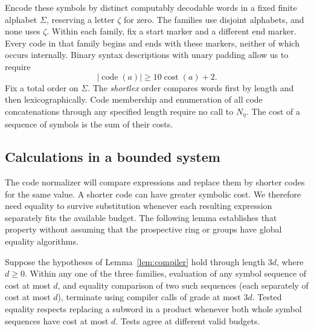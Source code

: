 Encode these symbols by distinct computably decodable words in
a fixed finite alphabet $\Sigma$, reserving a letter $\zeta$ for
zero. The families use disjoint alphabets, and none uses $\zeta$.
Within each family, fix a start marker and a different end marker.
Every code in that family begins and ends with these markers,
neither of which occurs internally.  Binary syntax descriptions with unary
padding allow us to require
\begin{equation}\label{eq:code-cost}
 |\operatorname{code}(a)|\geq10\operatorname{cost}(a)+2.
\end{equation}
Fix a total order on $\Sigma$. The \emph{shortlex} order compares
words first by length and then lexicographically.
Code membership and enumeration of all code concatenations
through any specified length require no call to $N_\eta$.
The cost of a sequence of symbols is the sum of their costs.

\subsection{Calculations in a bounded system}

The code normalizer will compare expressions and replace them by
shorter codes for the same value.  A shorter code can have greater
symbolic cost.  We therefore need equality to survive substitution
whenever each resulting expression separately fits the available
budget.  The following lemma establishes that property without
assuming that the prospective ring or groups have global equality
algorithms.

\begin{lemma}\label{lem:bounded-action-calculus}
Suppose the hypotheses of Lemma~\ref{lem:compiler} hold through
length $3d$, where $d\geq0$. Within any one of the three families,
evaluation of any symbol sequence of
cost at most $d$, and equality comparison of two such sequences
(each separately of cost at most $d$), terminate using compiler
calls of grade at most $3d$. Tested equality respects
replacing a subword in a product whenever both whole symbol
sequences have cost at most $d$.  Tests agree at different
valid budgets.
\end{lemma}

